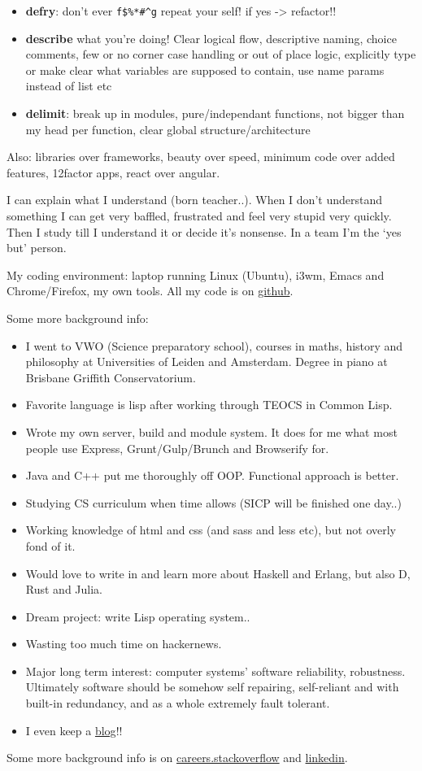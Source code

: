 \documentclass[11pt,a4paper,sans]{moderncv}        %
\begin{document}
\begin{itemize}
\item \textbf{defry}: don't ever \verb~f$%*#^g~ repeat your self!
   if yes -> refactor!!
\item \textbf{describe} what you're doing!
   Clear logical flow, descriptive naming, choice comments, few or no corner case handling or out of place logic, explicitly type or make clear what variables are supposed to contain, use name params instead of list etc
\item \textbf{delimit}: break up in modules, pure/independant functions, not bigger than my head per function, clear global structure/architecture
\end{itemize}
 
Also: libraries over frameworks, beauty over speed, minimum code over added features, 12factor apps, react over angular.
 
I can explain what I understand (born teacher..). When I don't understand something I can get very baffled, frustrated and feel very stupid very quickly. Then I study till I understand it or decide it's nonsense. In a team I'm the `yes but' person. 
 
My coding environment: laptop running Linux (Ubuntu), i3wm, Emacs and Chrome/Firefox, my own tools. All my code is on \href{http://github.com/michieljoris}{github}.
 
Some more background info:
 
\begin{itemize}
\item I went to VWO (Science preparatory school), courses in maths, history and philosophy at Universities of Leiden and Amsterdam. Degree in piano at Brisbane Griffith Conservatorium.
\item Favorite language is lisp after working through TEOCS in Common Lisp.
\item Wrote my own server, build and module system. It does for me what most people use Express, Grunt/Gulp/Brunch and Browserify for.
\item Java and C++ put me thoroughly off OOP. Functional approach is better.
\item Studying CS curriculum when time allows (SICP will be finished one day..)
\item Working knowledge of html and css (and sass and less etc), but not overly fond of it.
\item Would love to write in and learn more about Haskell and Erlang, but also D, Rust and Julia.
\item Dream project: write Lisp operating system..
\item Wasting too much time on hackernews.
\item Major long term interest: computer systems' software reliability, robustness. Ultimately
  software should be somehow self repairing, self-reliant and with built-in
  redundancy, and as a whole extremely fault tolerant.
\item I even keep a \href{http://www.axion5.net}{blog}!!
\end{itemize}
 
Some more background info is on \href{http://careers.stackoverflow.com/michieljoris}{careers.stackoverflow} and \href{http://nl.linkedin.com/in/michieljoris/}{linkedin}.








\makeletterclosing
\end{document}
